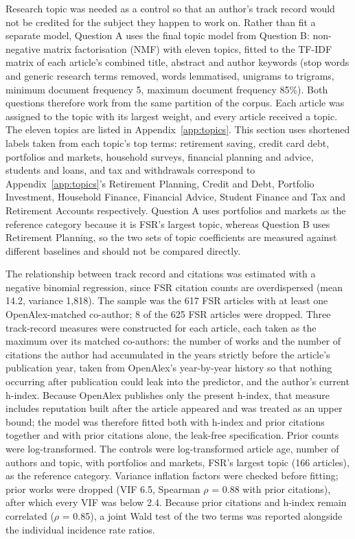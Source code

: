 \documentclass[11pt,a4paper]{article}
\begin{document}
Research topic was needed as a control so that an author's track record would not be credited for the subject they happen to work on. Rather than fit a separate model, Question A uses the final topic model from Question B: non-negative matrix factorisation (NMF) with eleven topics, fitted to the TF-IDF matrix of each article's combined title, abstract and author keywords (stop words and generic research terms removed, words lemmatised, unigrams to trigrams, minimum document frequency 5, maximum document frequency 85\%). Both questions therefore work from the same partition of the corpus. Each article was assigned to the topic with its largest weight, and every article received a topic. The eleven topics are listed in Appendix~\ref{app:topics}. This section uses shortened labels taken from each topic's top terms: retirement saving, credit card debt, portfolios and markets, household surveys, financial planning and advice, students and loans, and tax and withdrawals correspond to Appendix~\ref{app:topics}'s Retirement Planning, Credit and Debt, Portfolio Investment, Household Finance, Financial Advice, Student Finance and Tax and Retirement Accounts respectively. Question A uses portfolios and markets as the reference category because it is FSR's largest topic, whereas Question B uses Retirement Planning, so the two sets of topic coefficients are measured against different baselines and should not be compared directly.

The relationship between track record and citations was estimated with a negative binomial regression, since FSR citation counts are overdispersed (mean 14.2, variance 1,818). The sample was the 617 FSR articles with at least one OpenAlex-matched co-author; 8 of the 625 FSR articles were dropped. Three track-record measures were constructed for each article, each taken as the maximum over its matched co-authors: the number of works and the number of citations the author had accumulated in the years strictly before the article's publication year, taken from OpenAlex's year-by-year history so that nothing occurring after publication could leak into the predictor, and the author's current h-index. Because OpenAlex publishes only the present h-index, that measure includes reputation built after the article appeared and was treated as an upper bound; the model was therefore fitted both with h-index and prior citations together and with prior citations alone, the leak-free specification. Prior counts were log-transformed. The controls were log-transformed article age, number of authors and topic, with portfolios and markets, FSR's largest topic (166 articles), as the reference category. Variance inflation factors were checked before fitting; prior works were dropped (VIF 6.5, Spearman \(\rho\) = 0.88 with prior citations), after which every VIF was below 2.4. Because prior citations and h-index remain correlated (\(\rho\) = 0.85), a joint Wald test of the two terms was reported alongside the individual incidence rate ratios.
\end{document}
